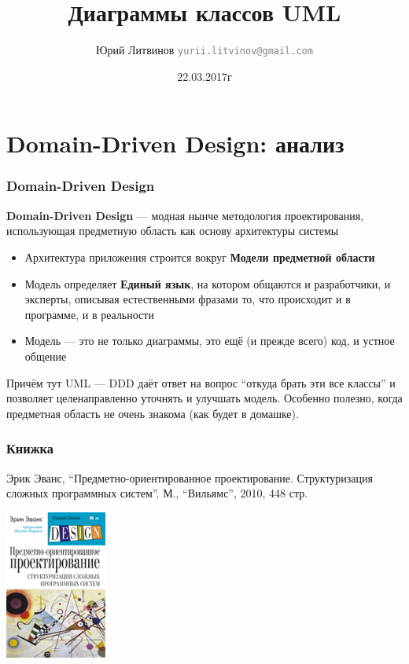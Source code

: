 \documentclass[xetex,mathserif,serif]{beamer}
\title{Диаграммы классов UML}
\author[Юрий Литвинов]{Юрий Литвинов \newline \textcolor{gray}{\small\texttt{yurii.litvinov@gmail.com}}}
\date{22.03.2017г}
\begin{document}
	
	\frame{\titlepage}

	\section{Domain-Driven Design: анализ}

	\begin{frame}
		\frametitle{Domain-Driven Design}
		\textbf{Domain-Driven Design} --- модная нынче методология проектирования, использующая предметную область как основу архитектуры системы
		\begin{itemize}
			\item Архитектура приложения строится вокруг \textbf{Модели предметной области}
			\item Модель определяет \textbf{Единый язык}, на котором общаются и разработчики, и эксперты, описывая естественными фразами то, что происходит и в программе, и в реальности
			\item Модель --- это не только диаграммы, это ещё (и прежде всего) код, и устное общение
		\end{itemize}
		Причём тут UML --- DDD даёт ответ на вопрос ``откуда брать эти все классы'' и позволяет целенаправленно уточнять и улучшать модель. 
		Особенно полезно, когда предметная область не очень знакома (как будет в домашке).
	\end{frame}

	\begin{frame}
		\frametitle{Книжка}
		Эрик Эванс, ``Предметно-ориентированное проектирование. Структуризация сложных программных систем''. М., ``Вильямс'', 2010, 448 стр.
		\begin{center}
			\includegraphics[width=0.25\textwidth]{dddCover.jpg}
		\end{center}
	\end{frame}
\end{document}
